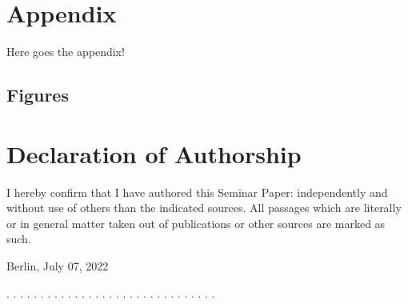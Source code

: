 \documentclass[a4paper,12pt]{article}
\newcommand{\thesistype}{Seminar Paper:}
\newcommand{\thesisauthor}{}
\newcommand{\thesisdate}{July 07, 2022}
\begin{document}
\appendix

\hypertarget{appendix}{%
\section{Appendix}\label{appendix}}

Here goes the appendix!

\hypertarget{figures}{%
\subsection{Figures}\label{figures}}



\newpage
\thispagestyle{empty}
\hypertarget{declaration-of-authorship}{%
\section*{Declaration of Authorship}\label{declaration-of-authorship}}

I hereby confirm that I have authored this \thesistype{} independently and
without use of others than the indicated sources. All passages which are
literally or in general matter taken out of publications or other sources are
marked as such.
\vspace{1cm}

Berlin, \thesisdate{}
\vspace{3cm}

. . . . . . . . . . . . . . . . . . . . . . . . . . . . . . .
\vspace{0.1cm}

\thesisauthor{}
\end{document}
